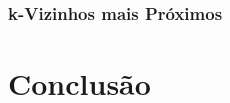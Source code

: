\documentclass[final,5p]{elsarticle}
\numberwithin{equation}{section}
\begin{document}
    \subsubsection{k-Vizinhos mais Próximos}


\section{Conclusão}


\appendix













\end{document}
